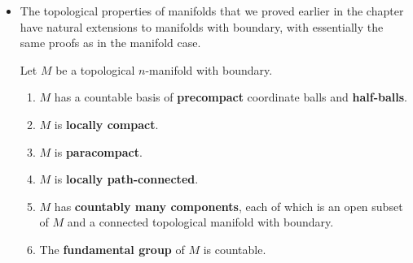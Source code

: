 \documentclass[11pt]{article}
\begin{document}
\begin{itemize}
\item  The topological properties of manifolds that we proved earlier in the chapter have
natural extensions to manifolds with boundary, with essentially the same proofs as in the manifold case.
\begin{proposition}
Let $M$ be a topological $n$-manifold with boundary.
\begin{enumerate}
\item $M$ has a countable basis of \textbf{precompact} coordinate balls and \textbf{half-balls}.
\item $M$ is \textbf{locally compact}.
\item $M$ is \textbf{paracompact}.
\item $M$ is \textbf{locally path-connected}.
\item $M$ has \textbf{countably many components}, each of which is an open subset of $M$ and a connected topological manifold with boundary.
\item The \textbf{fundamental group} of $M$ is countable.
\end{enumerate}
\end{proposition}
\end{itemize}
\end{document}
